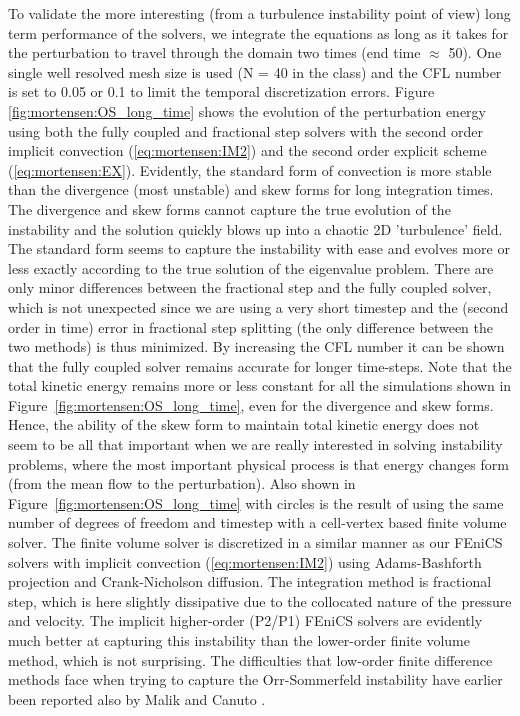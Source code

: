 To validate the more interesting (from a turbulence instability point of view) long term performance of the solvers, we integrate the equations as long as it takes for the perturbation to travel through the domain two times (end time $\approx$ 50). One single well resolved mesh size is used (N = 40 in the  class) and the CFL number is set to 0.05 or 0.1 to limit the temporal discretization errors. Figure \ref{fig:mortensen:OS_long_time} shows the evolution of the perturbation energy using both the fully coupled and fractional step solvers with the second order implicit convection (\eqref{eq:mortensen:IM2}) and the second order explicit scheme (\eqref{eq:mortensen:EX}). Evidently, the standard form of convection is more stable than the divergence (most unstable) and skew forms for long integration times. The divergence and skew forms cannot capture the true evolution of the instability and the solution quickly blows up into a chaotic 2D 'turbulence' field. The standard form seems to capture the instability with ease and evolves more or less exactly according to the true solution of the eigenvalue problem. There are only minor differences between the fractional step and the fully coupled solver, which is not unexpected since we are using a very short timestep and the (second order in time) error in fractional step splitting (the only difference between the two methods) is thus minimized. By increasing the CFL number it can be shown that the fully coupled solver remains accurate for longer time-steps. Note that the total kinetic energy remains more or less constant for all the simulations shown in Figure~\ref{fig:mortensen:OS_long_time}, even for the divergence and skew forms. Hence, the ability of the skew form to maintain total kinetic energy does not seem to be all that important when we are really interested in solving instability problems, where the most important physical process is that energy changes form (from the mean flow to the perturbation). Also shown in Figure~\ref{fig:mortensen:OS_long_time} with circles is the result of using the same number of degrees of freedom and timestep with a cell-vertex based finite volume solver. The finite volume solver is discretized in a similar manner as our FEniCS solvers with implicit convection (\eqref{eq:mortensen:IM2}) using Adams-Bashforth projection and Crank-Nicholson diffusion. The integration method is fractional step, which is here slightly dissipative due to the collocated nature of the pressure and velocity. The implicit higher-order (P2/P1) FEniCS solvers are evidently much better at capturing this instability than the lower-order finite volume method, which is not surprising. The difficulties that low-order finite difference methods face when trying to capture the Orr-Sommerfeld instability have earlier been reported also by Malik \cite{Malik1984} and Canuto \cite{Canuto07}.
